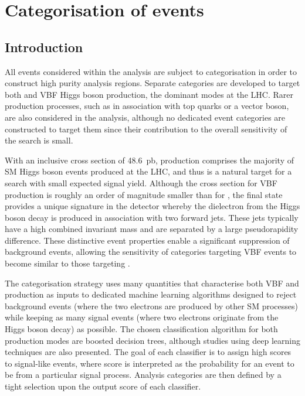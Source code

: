 \chapter{Categorisation of \Hee events}
\label{chap:eventCategorisation}

\section{Introduction}

All events considered within the \Hee analysis are subject to categorisation in order to construct high purity analysis regions. Separate categories are developed to target both \ggH and VBF Higgs boson production, the dominant modes at the LHC. Rarer production processes, such as in association with top quarks or a vector boson, are also considered in the analysis, although no dedicated event categories are constructed to target them since their contribution to the overall sensitivity of the search is small.

With an inclusive cross section of 48.6~pb, \ggH production comprises the majority of SM Higgs boson events produced at the LHC, and thus is a natural target for a search with small expected signal yield. Although the cross section for VBF production is roughly an order of magnitude smaller than for \ggH, the final state provides a unique signature in the detector whereby the dielectron from the Higgs boson decay is produced in association with two forward jets. These jets typically have a high combined invariant mass and are separated by a large pseudorapidity difference. These distinctive event properties enable a significant suppression of background events, allowing the sensitivity of categories targeting VBF events to become similar to those targeting \ggH. 

The categorisation strategy uses many quantities that characterise both VBF and \ggH production as inputs to dedicated machine learning algorithms designed to reject background events (where the two electrons are produced by other SM processes) while keeping as many signal events (where two electrons originate from the Higgs boson decay) as possible.
The chosen classification algorithm for both production modes are boosted decision trees, although studies using deep learning techniques are also presented. The goal of each classifier is to assign high scores to signal-like events, where score is interpreted as the probability for an event to be from a particular signal process. Analysis categories are then defined by a tight selection upon the output score of each classifier.

